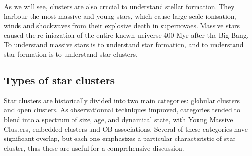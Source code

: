 As we will see, clusters are also crucial to understand stellar formation. They harbour the most massive and young stars, which cause large-scale ionisation, winds and shockwaves from their explosive death in supernovaes. Massive stars caused the re-iniozation of the entire known universe 400 Myr after the Big Bang. To understand massive stars is to understand star formation, and to understand star formation is to understand star clusters.



%
%

\subsection{Types of star clusters}

Star clusters are historically divided into two main categories: globular clusters and open clusters. As observationnal techniques improved, categories tended to blend into a spectrum of size, age, and dynamical state, with Young Massive Clusters, embedded clusters and OB associations. Several of these categories have significant overlap, but each one emphasizes a particular characteristic of star cluster, thus these are useful for a comprehensive discussion.


